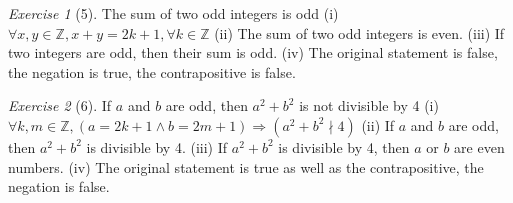 \documentclass[12pt]{amsart}
\theoremstyle{remark}
\newtheorem*{exercise}{Exercise}%
\newcommand{\ZZ}{\ensuremath{\mathbb Z}}
\theoremstyle{mycomment}
\begin{document}
\begin{exercise}[5] The sum of two odd integers is odd\newline \newline
	(i) $\forall x,y \in \ZZ, x + y = 2k+ 1, \forall k \in \ZZ$ \newline 
	(ii) The sum of two odd integers is even.\newline
	(iii) If two integers are odd, then their sum is odd.\newline
	(iv) The original statement is false, the negation is true, the contrapositive is false.\newline
\end{exercise}

\begin{exercise}[6] If $a$ and $b$ are odd, then $a^2 + b^2$ is not divisible by 4 \newline \newline
	(i) $\forall k,m \in \ZZ, (a = 2k+1 \land b = 2m+1) \Rightarrow (a^2 + b^2 \nmid 4)$ \newline
	(ii) If $a $ and $b$ are odd, then $a^2 + b^2$ is divisible by 4.\newline
	(iii) If $a^2 + b^2$ is divisible by 4, then $a$ or $b$ are even numbers.\newline
	(iv) The original statement is true as well as the contrapositive, the negation is false.\newline
\end{exercise}
 
\end{document}
